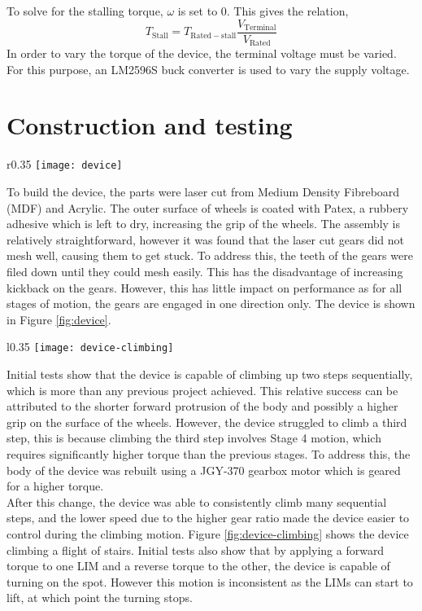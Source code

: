 \noindent To solve for the stalling torque, $\omega$ is set to $0$. This gives the relation,
\begin{equation}
	T_\mathrm{Stall} = T_\mathrm{Rated-stall}\frac{V_\mathrm{Terminal}}{V_\mathrm{Rated}}
\end{equation}
In order to vary the torque of the device, the terminal voltage must be varied. For this purpose, an LM2596S buck converter is used to vary the supply voltage.

\section{Construction and testing}

\begin{wrapfigure}{r}{0.35\textwidth}
	\centering
	\texttt{[image: device]}
	\caption{Built device}
	\label{fig:device}
\end{wrapfigure}

To build the device, the parts were laser cut from Medium Density Fibreboard (MDF) and Acrylic. The outer surface of wheels is coated with Patex, a rubbery adhesive which is left to dry, increasing the grip of the wheels. The assembly is relatively straightforward, however it was found that the laser cut gears did not mesh well, causing them to get stuck. To address this, the teeth of the gears were filed down until they could mesh easily. This has the disadvantage of increasing kickback on the gears. However, this has little impact on performance as for all stages of motion, the gears are engaged in one direction only. The device is shown in Figure \ref{fig:device}.\\


\begin{wrapfigure}{l}{0.35\textwidth}
	\centering
	\texttt{[image: device-climbing]}
	\caption{Device climbing stairs}
	\label{fig:device-climbing}
\end{wrapfigure}
Initial tests show that the device is capable of climbing up two steps sequentially, which is more than any previous project achieved. This relative success can be attributed to the shorter forward protrusion of the body and possibly a higher grip on the surface of the wheels. However, the device struggled to climb a third step, this is because climbing the third step involves Stage 4 motion, which requires significantly higher torque than the previous stages. To address this, the body of the device was rebuilt using a JGY-370 gearbox motor which is geared for a higher torque. \\
After this change, the device was able to consistently climb many sequential steps, and the lower speed due to the higher gear ratio made the device easier to control during the climbing motion. Figure \ref{fig:device-climbing} shows the device climbing a flight of stairs. Initial tests also show that by applying a forward torque to one LIM and a reverse torque to the other, the device is capable of turning on the spot. However this motion is inconsistent as the LIMs can start to lift, at which point the turning stops.

